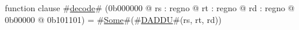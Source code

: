 function clause #\hyperref[zdecode]{decode}# (0b000000 @ rs : regno @ rt : regno @ rd : regno @ 0b00000 @ 0b101101) =
  #\hyperref[zSome]{Some}#(#\hyperref[zDADDU]{DADDU}#(rs, rt, rd))
